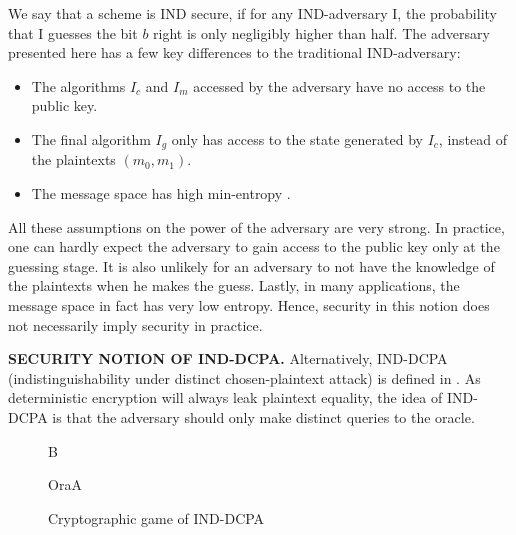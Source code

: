 \documentclass[10pt]{book}
\begin{document}
We say that a scheme is IND secure, if for any IND-adversary I, the probability that I guesses the bit $b$ right is only negligibly higher than half. The adversary presented here has a few key differences to the traditional IND-adversary:
\begin{itemize}
	\item
	The algorithms $I_c$ and $I_m$ accessed by the adversary have no access to the public key.
	\item
	The final algorithm $I_g$ only has access to the state generated by $I_c$, instead of the plaintexts $(m_0, m_1)$.
	\item
	The message space has high min-entropy \cite{2008arXiv0807.1338K}.
\end{itemize}

All these assumptions on the power of the adversary are very strong. In practice, one can hardly expect the adversary to gain access to the public key only at the guessing stage. It is also unlikely for an adversary to not have the knowledge of the plaintexts when he makes the guess. Lastly, in many applications, the message space in fact has very low entropy. Hence, security in this notion does not necessarily imply security in practice.

\textbf{SECURITY NOTION OF IND-DCPA.} Alternatively, IND-DCPA (indistinguishability under distinct chosen-plaintext attack) is defined in \cite{Bellare:2002:AES:586110.586112}. As deterministic encryption will always leak plaintext equality, the idea of IND-DCPA is that the adversary should only make distinct queries to the oracle.

\begin{figure}[H]
	\begin{center}
	\begin{bbrenv}{B}
		\begin{bbrbox}[name=Adversary, minheight=3.5cm, minwidth=2.5cm]
		\end{bbrbox}
		
		\bbrmsgspace{1cm}
		\bbrmsgspace{1cm}
		
		\begin{bbroracle}{OraA}
			\begin{bbrbox}[name={Encryption}, minheight=1cm]
			\end{bbrbox}
		\end{bbroracle}
		
	\end{bbrenv}
	\end{center}

	\caption{Cryptographic game of IND-DCPA}
\end{figure}
\end{document}
